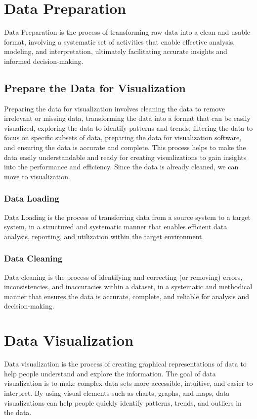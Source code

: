 \documentclass{article}
\begin{document}
\section{Data Preparation}
Data Preparation is the process of transforming raw data into a clean and usable format, involving a systematic set of activities that enable effective analysis, modeling, and interpretation, ultimately facilitating accurate insights and informed decision-making.
\subsection{Prepare the Data for Visualization}
Preparing the data for visualization involves cleaning the data to remove irrelevant or missing data, transforming the data into a format that can be easily visualized, exploring the data to identify patterns and trends, filtering the data to focus on specific subsets of data, preparing the data for visualization software, and ensuring the data is accurate and complete. This process helps to make the data easily understandable and ready for creating visualizations to gain insights into the performance and efficiency. Since the data is already cleaned, we can move to visualization.
\subsubsection{Data Loading}
Data Loading is the process of transferring data from a source system to a target system, in a structured and systematic manner that enables efficient data analysis, reporting, and utilization within the target environment.
\subsubsection{Data Cleaning}
Data cleaning is the process of identifying and correcting (or removing) errors, inconsistencies, and inaccuracies within a dataset, in a systematic and methodical manner that ensures the data is accurate, complete, and reliable for analysis and decision-making.

\section{Data Visualization}
Data visualization is the process of creating graphical representations of data to help people understand and explore the information. The goal of data visualization is to make complex data sets more accessible, intuitive, and easier to interpret. By using visual elements such as charts, graphs, and maps, data visualizations can help people quickly identify patterns, trends, and outliers in the data.
\end{document}
